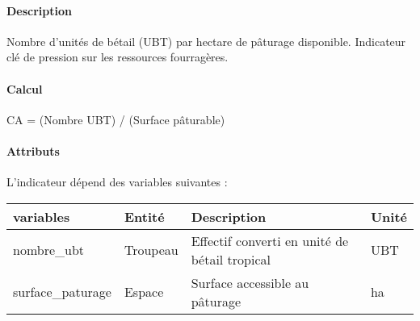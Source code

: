 \documentclass[
]{article}
\newenvironment{Shaded}{\begin{snugshade}}{\end{snugshade}}
\newcommand{\NormalTok}[1]{#1}
\begin{document}
\paragraph{Description}\label{description}

Nombre d'unités de bétail (UBT) par hectare de pâturage disponible.
Indicateur clé de pression sur les ressources fourragères.

\paragraph{Calcul}\label{calcul}

\begin{Shaded}
\begin{Highlighting}[]
\NormalTok{CA = (Nombre UBT) / (Surface pâturable)}
\end{Highlighting}
\end{Shaded}

\paragraph{Attributs}\label{attributs-18}

L'indicateur dépend des variables suivantes :

\begin{longtable}[]{@{}
  >{\raggedright\arraybackslash}p{}
  >{\raggedright\arraybackslash}p{}
  >{\raggedright\arraybackslash}p{}
  >{\raggedright\arraybackslash}p{}@{}}
\toprule\noalign{}
\begin{minipage}[b]{\linewidth}\raggedright
\textbf{variables}
\end{minipage} & \begin{minipage}[b]{\linewidth}\raggedright
\textbf{Entité}
\end{minipage} & \begin{minipage}[b]{\linewidth}\raggedright
\textbf{Description}
\end{minipage} & \begin{minipage}[b]{\linewidth}\raggedright
\textbf{Unité}
\end{minipage} \\
\midrule\noalign{}
\endhead
\bottomrule\noalign{}
\endlastfoot
nombre\_ubt & Troupeau & Effectif converti en unité de bétail tropical &
UBT \\
surface\_paturage & Espace & Surface accessible au pâturage & ha \\
\end{longtable}
\end{document}
